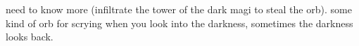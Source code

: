 

   need to know more (infiltrate the tower of the dark magi to steal the orb).
some kind of orb for scrying
when you look into the darkness, sometimes the darkness looks back.
